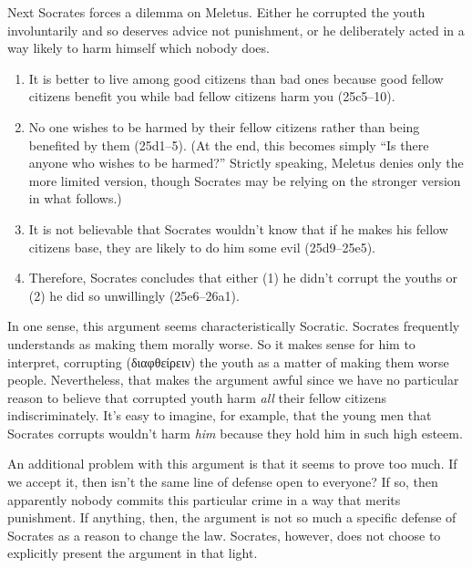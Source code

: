 \documentclass[11pt]{article}
\begin{document}
Next Socrates forces a dilemma on Meletus. Either he corrupted the youth involuntarily and so deserves advice not punishment, or he deliberately acted in a way likely to harm himself which nobody does.

\begin{enumerate}
    \item It is better to live among good citizens than bad ones because good fellow citizens benefit you while bad fellow citizens harm you (25c5--10).

    \item No one wishes to be harmed by their fellow citizens rather than being benefited by them (25d1--5). (At the end, this becomes simply ``Is there anyone who wishes to be harmed?'' Strictly speaking, Meletus denies only the more limited version, though Socrates may be relying on the stronger version in what follows.)

    \item It is not believable that Socrates wouldn't know that if he makes his fellow citizens base, they are likely to do him some evil (25d9--25e5).

    \item Therefore, Socrates concludes that either (1) he didn't corrupt the youths or (2) he did so unwillingly (25e6--26a1).
\end{enumerate}

In one sense, this argument seems characteristically Socratic.  Socrates frequently understands  as making them morally worse.  So it makes sense for him to interpret, corrupting ({\g διαφθείρειν}) the youth as a matter of making them worse people.  Nevertheless, that makes the argument awful since we have no particular reason to believe that corrupted youth harm \emph{all} their fellow citizens indiscriminately.  It's easy to imagine, for example, that the young men that Socrates corrupts wouldn't harm \emph{him} because they hold him in such high esteem.

An additional problem with this argument is that it seems to prove too much.  If we accept it, then isn't the same line of defense open to everyone?  If so, then apparently nobody commits this particular crime in a way that merits punishment.  If anything, then, the argument is not so much a specific defense of Socrates as a reason to change the law.  Socrates, however, does not choose to explicitly present the argument in that light.

\end{document}
